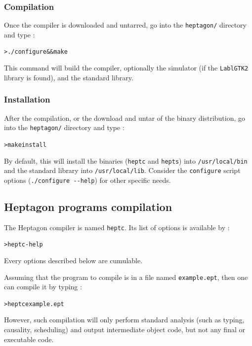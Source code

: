 \documentclass[a4paper]{article}
\begin{document}
\subsubsection{Compilation}
\label{sec:compilation}

Once the compiler is downloaded and untarred, go into the \texttt{heptagon/}
directory and type :

\begin{alltt}
> ./configure && make
\end{alltt}

This command will build the compiler, optionally the simulator (if the
\texttt{LablGTK2} library is found), and the standard library.

\subsubsection{Installation}
\label{sec:installation}

After the compilation, or the download and untar of the binary distribution, go
into the \texttt{heptagon/} directory and type :

\begin{alltt}
> make install
\end{alltt}

By default, this will install the binaries (\texttt{heptc} and \texttt{hepts}) into
\texttt{/usr/local/bin} and the standard library into
\texttt{/usr/local/lib}. Consider the \texttt{configure} script options
(\verb+./configure --help+) for other specific needs.


\subsection{Heptagon programs compilation}
\label{sec:hept-compilation}

The Heptagon compiler is named \texttt{heptc}. Its list of options is available by
:

\begin{alltt}
> heptc -help
\end{alltt}

Every options described below are cumulable.

Assuming that the program to compile is in a file named \texttt{example.ept},
then one can compile it by typing :

\begin{alltt}
> heptc example.ept
\end{alltt}

However, such compilation will only perform standard analysis (such as typing,
causality, scheduling) and output intermediate object code, but not any final or
executable code.
\end{document}
